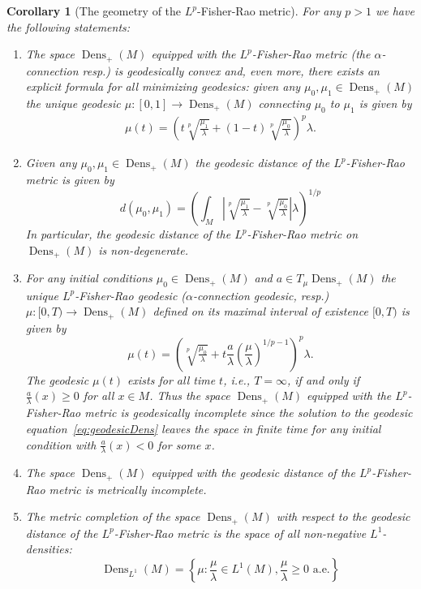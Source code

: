 \documentclass[11pt]{amsart}
\newtheorem{corollary}[theorem]{Corollary}
\theoremstyle{definition}
\newcommand{\dx}{\lambda}
\newcommand{\Dens}{\operatorname{Dens}_+(M)}
\begin{document}
\begin{corollary}[The geometry of the $L^p$-Fisher-Rao metric]\label{cor:Lpgeometry}
For any $p>1$ we have the following statements:
\begin{enumerate}[label=(\alph*)]
    \item \label{prop:convex} The space $\Dens$ equipped with the $L^p$-Fisher-Rao metric (the $\alpha$-connection resp.) is  geodesically convex and, even more, there exists an explicit formula for all minimizing geodesics: given any $\mu_0,\mu_1\in \Dens$ the unique geodesic $\mu: [0,1]\to\Dens$ connecting $\mu_0$ to  $\mu_1$ is given by
     \begin{align*}
\mu(t)=\left(t\sqrt[p]{\tfrac{\mu_1}{\dx}}+(1-t)\sqrt[p]{\tfrac{\mu_0}{\dx}}\right)^p \dx.
\end{align*}
\item  Given any $\mu_0,\mu_1\in \Dens$ the geodesic distance of the $L^p$-Fisher-Rao metric is given by
\begin{equation*}
d(\mu_0,\mu_1) = \left( \int_M \left| \sqrt[p]{\tfrac{\mu_1}{\dx}}-\sqrt[p]{\tfrac{\mu_0}{\dx}}  \right| \dx\right)^{1/p}
\end{equation*}
In particular, the geodesic distance of the $L^p$-Fisher-Rao metric on $\Dens$ is non-degenerate.
    \item  For any initial conditions $\mu_0\in \Dens$ and $a\in T_\mu \Dens$ the unique $L^p$-Fisher-Rao geodesic ($\alpha$-connection geodesic, resp.) $\mu:[0,T)\to \Dens$
    defined on its maximal interval of existence $[0,T)$ is given by
    \begin{equation*}
    \mu(t)=\left(\sqrt[p]{\tfrac{\mu_0}{\dx}}+
    t\frac{a}{\dx}\left(\frac{\mu}{\dx}\right)^{1/p-1}\right)^p \dx.
    \end{equation*}
    The geodesic $\mu(t)$ exists for all time $t$, i.e., $T=\infty$, if and only if $\frac{a}{\dx}(x)\geq0$ for all $x\in M$.
    Thus the space $\Dens$ equipped with the $L^p$-Fisher-Rao metric is  geodesically incomplete since the solution to the geodesic equation~\eqref{eq:geodesicDens} leaves the space in finite time for any initial condition with $\frac{a}{\dx}(x)<0$ for some $x$. 
    \item \label{prop:metriccomplete} The space $\Dens$ equipped with the geodesic distance of the $L^p$-Fisher-Rao metric is  metrically incomplete.
    \item The metric completion of the space $\Dens$ with respect to the geodesic distance of the $L^p$-Fisher-Rao metric is the space of all non-negative $L^1$-densities:
    \begin{equation*}
       \operatorname{Dens}_{L^1}(M)=\left\{\mu: \frac{\mu}{\dx}\in L^1(M),  \frac{\mu}{\dx} \geq 0 \text{ a.e.}\right\} 
    \end{equation*}
    \end{enumerate}
\end{corollary}
\end{document}
